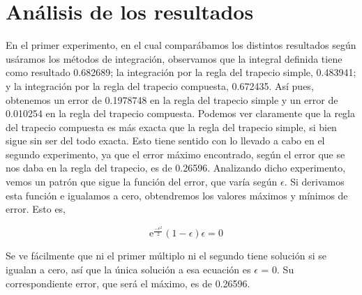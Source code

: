 \section{Análisis de los resultados}
\label{3:sec:4}
\parindent=1cm
\raggedright
 En el primer experimento, en el cual comparábamos los distintos resultados según usáramos los métodos de integración,
 observamos que la integral definida tiene como resultado 0.682689; la integración por la regla del trapecio simple, 0.483941;
 y la integración por la regla del trapecio compuesta, 0.672435.
Así pues, obtenemos un error de 0.1978748 en la regla del trapecio simple y un error de 0.010254 en la regla del trapecio compuesta.
Podemos ver claramente que la regla del trapecio compuesta es más exacta que la regla del trapecio simple, si bien sigue sin ser del todo exacta.
Esto tiene sentido con lo llevado a cabo en el segundo experimento, ya que el error máximo encontrado, según el error que se nos daba en la regla del trapecio,
es de 0.26596. Analizando dicho experimento, vemos un patrón que sigue la función del error, que varía según $\epsilon$.
Si derivamos esta función e igualamos a cero, obtendremos los valores máximos y mínimos de error. Esto es,

\[
\quad\text{e}^{\frac{-\epsilon^2}{2}} \displaystyle (1-\epsilon) \displaystyle \epsilon = 0
\]

Se ve fácilmente que ni el primer múltiplo ni el segundo tiene solución si se igualan a cero, así que la única solución a esa ecuación es $\epsilon$ = 0.
Su correspondiente error, que será el máximo, es de 0.26596.

